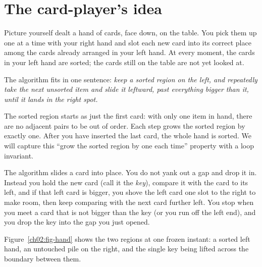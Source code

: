 \section{The card-player's idea}

Picture yourself dealt a hand of cards, face down, on the table. You pick them up one
at a time with your right hand and slot each new card into its correct place among the
cards already arranged in your left hand. At every moment, the cards in your left hand
are sorted; the cards still on the table are not yet looked at.

\begin{intuitionbox}
The algorithm fits in one sentence: \emph{keep a sorted region on the left,
and repeatedly take the next unsorted item and slide it leftward, past everything
bigger than it, until it lands in the right spot.}

The sorted region starts as just the first card: with only one item in hand, there are
no adjacent pairs to be out of order. Each step grows the sorted region by exactly
one. After you have inserted the last card, the whole hand is sorted. We will capture
this ``grow the sorted region by one each time'' property with a loop invariant.
\end{intuitionbox}

The algorithm slides a card into place. You do not yank
out a gap and drop it in. Instead you hold the new card (call it the \emph{key}),
compare it with the card to its left, and if that left card is bigger, you shove the
left card one slot to the right to make room, then keep comparing with the next card
further left. You stop when you meet a card that is not bigger than the key (or you run
off the left end), and you drop the key into the gap you just opened.

Figure~\ref{ch02:fig-hand} shows the two regions at one frozen instant: a sorted left
hand, an untouched pile on the right, and the single key being lifted across the
boundary between them.

